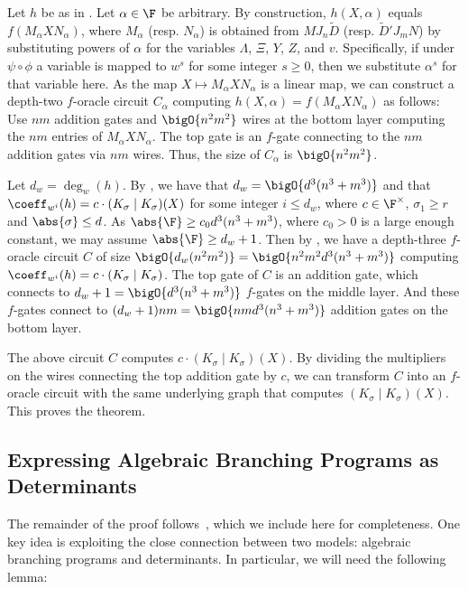 \documentclass[letterpaper, 11pt]{amsart}
\begin{document}
\begin{pf}
    Let $h$ be as in .
    Let $\alpha\in\F$ be arbitrary.
    By construction, $h(X,\alpha)$ equals $f(M_\alpha X N_\alpha)$, where $M_\alpha$ (resp. $N_\alpha$) is obtained from $M J_n \widetilde{D}$ (resp. $\widetilde{D}' J_m N$) by substituting powers of $\alpha$ for the variables $\Lambda$, $\Xi$, $Y$, $Z$, and $v$.
    Specifically, if under $\psi \circ \phi$ a variable is mapped to $w^s$ for some integer $s \geq 0$, then we substitute $\alpha^s$ for that variable here.
    As the map $X\mapsto M_\alpha X N_\alpha$ is a linear map, we can construct a depth-two $f$-oracle circuit $C_\alpha$ computing $h(X,\alpha)=f(M_\alpha X N_\alpha)$ as follows:
    Use $nm$ addition gates and $\bigO{n^2m^2}$ wires at the bottom layer computing the $nm$ entries of $M_\alpha X N_\alpha$.
    The top gate is an $f$-gate connecting to the $nm$ addition gates via $nm$ wires.
    Thus, the size of $C_\alpha$ is $\bigO{n^2m^2}$.
    
    Let $d_w=\deg_w(h)$.
    By , we have that $d_w = \bigO{d^3(n^3+m^3)}$ and that $\coeff_{w^i}(h) = c\cdot {(K_\sigma\mid K_\sigma)}(X)$ for some integer $i\leq d_w$, where $c\in\F^\times$, $\sigma_1\geq r$ and $\abs{\sigma} \leq d$.
    As $\abs{\F} \geq c_0 d^3(n^3+m^3)$, where $c_0>0$ is a large enough constant, we may assume $\abs{\F} \geq d_w+1$.
    Then by , we have a depth-three $f$-oracle circuit $C$ of size $\bigO{d_w(n^2m^2)} = \bigO{n^2m^2d^3(n^3+m^3)}$ computing $\coeff_{w^i}(h)=c\cdot (K_\sigma\mid K_\sigma)$. 
    The top gate of $C$ is an addition gate, which connects to $d_w+1 = \bigO{d^3(n^3+m^3)}$ $f$-gates on the middle layer.
    And these $f$-gates connect to $(d_w+1)nm = \bigO{nmd^3(n^3+m^3)}$ addition gates on the bottom layer.
    
    The above circuit $C$ computes $c \cdot (K_\sigma\mid K_\sigma)(X)$.
    By dividing the multipliers on the wires connecting the top addition gate by $c$, we can transform $C$ into an $f$-oracle circuit with the same underlying graph that computes $(K_\sigma\mid K_\sigma)(X)$.
    This proves the theorem.
\end{pf}

\subsection{Expressing Algebraic Branching Programs as Determinants}

The remainder of the proof follows~\cite{AF21}, which we include here for completeness.
One key idea is exploiting the close connection between two models: algebraic branching programs and determinants.
In particular, we will need the following lemma:
\end{document}
